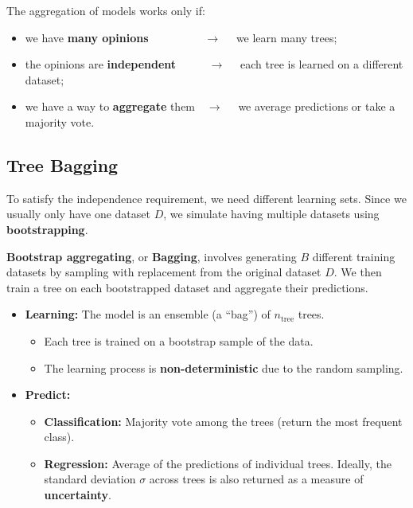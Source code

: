 The aggregation of models works only if:
\begin{itemize}[noitemsep]
    \item we have \textbf{many opinions} $\qquad\ \, \; \qquad \to \quad$ we learn many trees;
    \item the opinions are \textbf{independent} $\; \; \qquad \to \quad$ each tree is learned on a different dataset;
    \item we have a way to \textbf{aggregate} them $\ \ \ \to \quad$ we average predictions or take a majority vote.
\end{itemize}

\subsection{Tree Bagging}

To satisfy the independence requirement, we need different learning sets. Since we usually only have one dataset $D$, we simulate having multiple datasets using \textbf{bootstrapping}.

\textbf{Bootstrap aggregating}, or \textbf{Bagging}, involves generating $B$ different training datasets by sampling with replacement from the original dataset $D$. We then train a tree on each bootstrapped dataset and aggregate their predictions.

\begin{definitionblock}
    \begin{itemize}
        \item \textbf{Learning:} The model is an ensemble (a ``bag'') of $n_{\text{tree}}$ trees. 
        \begin{itemize}[noitemsep]
            \item Each tree is trained on a bootstrap sample of the data.
            \item The learning process is \textbf{non-deterministic} due to the random sampling.
        \end{itemize}
        \item \textbf{Predict:} 
        \begin{itemize}[noitemsep]
            \item \textbf{Classification:} Majority vote among the trees (return the most frequent class).
            \item \textbf{Regression:} Average of the predictions of individual trees. Ideally, the standard deviation $\sigma$ across trees is also returned as a measure of \textbf{uncertainty}.
        \end{itemize}
    \end{itemize}
\end{definitionblock}

